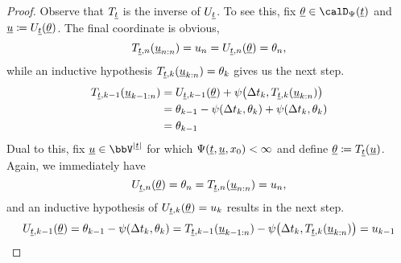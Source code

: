 \begin{proof}
  Observe that $T_{\underline t}$ is the inverse of $U_{\underline t}$.
  To see this, fix $\underline\twistVar \in \momentSpace(\underline t)$ and $\underline{u} \coloneqq U_{\underline t}(\underline{\theta})$.
  The final coordinate is obvious,
  \begin{equation*}
    T_{\underline t, n}(\underline{u}_{n:n}) = u_n = U_{\underline t,n}(\underline{\theta}) = \theta_n,
  \end{equation*}
  while an inductive hypothesis $T_{\underline t, k}(\underline{u}_{k:n}) = \theta_k$ gives us the next step.
  \begin{align*}
    T_{\underline t, k-1}(\underline{u}_{k-1:n}) 
    &= U_{\underline t, k-1}(\underline{\theta}) + \psi\big(\Delta t_k, T_{\underline t, k}(\underline{u}_{k:n}) \big) \\
    &= \theta_{k-1} - \psi(\Delta t_k, \theta_k) + \psi(\Delta t_k, \theta_k )\\
    &= \theta_{k-1}
  \end{align*}
  Dual to this, fix $\underline\momentVar \in \vecSpace^{|\underline t|}$ for which $\Psi(\underline t, \underline{u}, x_0) < \infty$ and define $\underline{\theta} \coloneqq T_{\underline t}(\underline{u})$.
  Again, we immediately have
  \begin{equation*}
    U_{\underline t, n}(\underline{\theta}) = \theta_n = T_{\underline t, n}(\underline{u}_{n:n}) = u_n,
  \end{equation*}
  and an inductive hypothesis of $U_{\underline t, k}(\underline{\theta}) = u_k$ results in the next step.
  \begin{equation*}
    U_{\underline t, k-1}(\underline{\theta}) = \theta_{k-1} - \psi(\Delta t_k, \theta_k) = T_{\underline t,k-1}(\underline{u}_{k-1:n}) - \psi\big(\Delta t_k, T_{\underline t, k}(\underline{u}_{k:n})\big) = u_{k-1}
  \end{equation*}


\end{proof}
